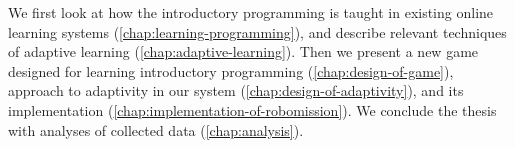We first look at how the introductory programming is taught
in existing online learning systems
(\cref{chap:learning-programming}),
and describe relevant techniques of adaptive learning
(\cref{chap:adaptive-learning}).
Then we present a new game designed for learning introductory programming
(\cref{chap:design-of-game}),
approach to adaptivity in our system (\cref{chap:design-of-adaptivity}),
and its implementation (\cref{chap:implementation-of-robomission}).
We conclude the thesis with analyses of collected data
(\cref{chap:analysis}).
